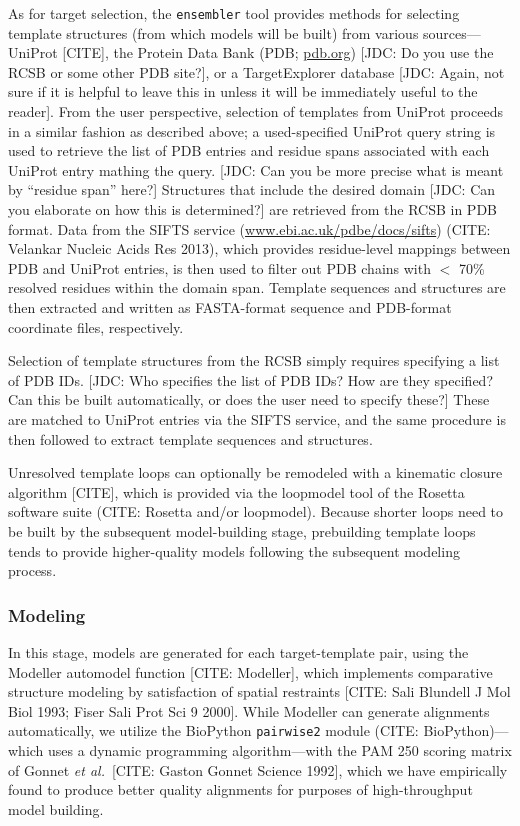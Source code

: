 \documentclass[aps,pre,twocolumn,nofootinbib,superscriptaddress,linenumbers]{revtex4-1}
\begin{document}
As for target selection, the {\tt ensembler} tool provides methods for selecting template structures (from which models will be built) from various sources---UniProt {\color{red}[CITE]}, the Protein Data Bank (PDB; \href{http://www.pdb.org}{pdb.org}) {\color{red}[JDC: Do you use the RCSB or some other PDB site?]}, or a TargetExplorer database {\color{red}[JDC: Again, not sure if it is helpful to leave this in unless it will be immediately useful to the reader]}.
From the user perspective, selection of templates from UniProt proceeds in a similar fashion as described above; a used-specified UniProt query string is used to retrieve the list of PDB entries and residue spans associated with each UniProt entry mathing the query.
{\color{red}[JDC: Can you be more precise what is meant by ``residue span'' here?]}
Structures that include the desired domain {\color{red}[JDC: Can you elaborate on how this is determined?]} are retrieved from the RCSB in PDB format.
Data from the SIFTS service (\href{http://www.ebi.ac.uk/pdbe/docs/sifts/}{www.ebi.ac.uk/pdbe/docs/sifts}) (CITE: Velankar Nucleic Acids Res 2013), which provides residue-level mappings between PDB and UniProt entries, is then used to filter out PDB chains with $<$ 70\% resolved residues within the domain span.
Template sequences and structures are then extracted and written as FASTA-format sequence and PDB-format coordinate files, respectively.

Selection of template structures from the RCSB simply requires specifying a list of PDB IDs.
{\color{red}[JDC: Who specifies the list of PDB IDs?  How are they specified?  Can this be built automatically, or does the user need to specify these?]}
These are matched to UniProt entries via the SIFTS service, and the same procedure is then followed to extract template sequences and structures.

Unresolved template loops can optionally be remodeled with a kinematic closure algorithm {\color{red}[CITE]}, which is provided via the loopmodel tool of the Rosetta software suite (CITE: Rosetta and/or loopmodel).
Because shorter loops need to be built by the subsequent model-building stage, prebuilding template loops tends to provide higher-quality models following the subsequent modeling process.

\subsubsection{Modeling}

In this stage, models are generated for each target-template pair, using the Modeller automodel function {\color{red}[CITE: Modeller]}, which implements comparative structure modeling by satisfaction of spatial restraints {\color{red}[CITE: Sali Blundell J Mol Biol 1993; Fiser Sali Prot Sci 9 2000]}.
While Modeller can generate alignments automatically, we utilize the BioPython {\tt pairwise2} module (CITE: BioPython)---which uses a dynamic programming algorithm---with the PAM 250 scoring matrix of Gonnet \textit{et al.}~{\color{red}[CITE: Gaston Gonnet Science 1992]}, which we have empirically found to produce better quality alignments for purposes of high-throughput model building.
\end{document}
